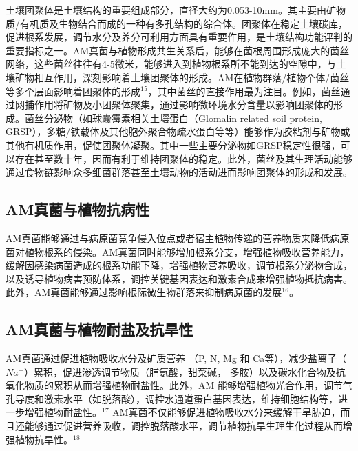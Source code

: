\documentclass[]{book}
\begin{document}
土壤团聚体是土壤结构的重要组成部分，直径大约为0.053-10mm。其主要由矿物质/有机质及生物结合而成的一种有多孔结构的综合体。团聚体在稳定土壤碳库，促进根系发展，调节水分及养分可利用方面具有重要作用，是土壤结构功能评判的重要指标之一。AM真菌与植物形成共生关系后，能够在菌根周围形成庞大的菌丝网络，这些菌丝往往有4-5微米，能够进入到植物根系所不能到达的空隙中，与土壤矿物相互作用，深刻影响着土壤团聚体的形成。AM在植物群落/植物个体/菌丝等多个层面影响着团聚体的形成\(^{15}\)，其中菌丝的直接作用最为注目。例如，菌丝通过网捕作用将矿物及小团聚体聚集，通过影响微环境水分含量以影响团聚体的形成。菌丝分泌物（如球囊霉素相关土壤蛋白（Glomalin related soil protein, GRSP），多糖/铁载体及其他胞外聚合物疏水蛋白等等）能够作为胶粘剂与矿物或其他有机质作用，促使团聚体凝聚。其中一些主要分泌物如GRSP稳定性很强，可以存在甚至数十年，因而有利于维持团聚体的稳定。此外，菌丝及其生理活动能够通过食物链影响众多细菌群落甚至土壤动物的活动进而影响团聚体的形成和发展。

\hypertarget{amux771fux83ccux4e0eux690dux7269ux6297ux75c5ux6027}{%
\subsection{AM真菌与植物抗病性}\label{amux771fux83ccux4e0eux690dux7269ux6297ux75c5ux6027}}

AM真菌能够通过与病原菌竞争侵入位点或者宿主植物传递的营养物质来降低病原菌对植物根系的侵染。AM真菌同时能够增加根系分支，增强植物吸收营养能力，缓解因感染病菌造成的根系功能下降，增强植物营养吸收，调节根系分泌物合成，以及诱导植物病害预防体系，调控关键基因表达和激素合成来增强植物抵抗病害。此外，AM真菌能够通过影响根际微生物群落来抑制病原菌的发展\(^{16}\)。

\hypertarget{amux771fux83ccux4e0eux690dux7269ux8010ux76d0ux53caux6297ux65f1ux6027}{%
\subsection{AM真菌与植物耐盐及抗旱性}\label{amux771fux83ccux4e0eux690dux7269ux8010ux76d0ux53caux6297ux65f1ux6027}}

AM真菌通过促进植物吸收水分及矿质营养 （P, N, Mg 和 Ca等），减少盐离子（\(Na^+\)）累积，促进渗透调节物质（脯氨酸，甜菜碱， 多胺）以及碳水化合物及抗氧化物质的累积从而增强植物耐盐性。此外，AM 能够增强植物光合作用，调节气孔导度和激素水平（如脱落酸），调控水通道蛋白基因表达，维持细胞结构等，进一步增强植物耐盐性。\(^{17}\) AM真菌不仅能够促进植物吸收水分来缓解干旱胁迫，而且还能够通过促进营养吸收，调控脱落酸水平，调节植物抗旱生理生化过程从而增强植物抗旱性。\(^{18}\)
\end{document}

